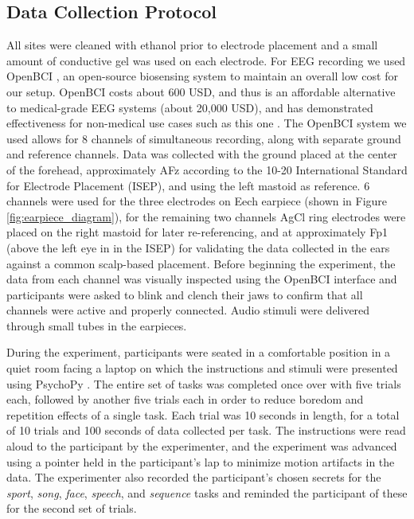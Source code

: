 \documentclass{sigchi}
\begin{document}
\subsection{Data Collection Protocol}
All sites were cleaned with ethanol prior to electrode placement and a small amount of conductive gel was used on each electrode. For EEG recording we used OpenBCI \cite{michalska2009openbci}, an open-source biosensing system to maintain an overall low cost for our setup. OpenBCI costs about 600 USD, and thus is an affordable alternative to medical-grade EEG systems (about 20,000 USD), and has demonstrated effectiveness for non-medical use cases such as this one \cite{Frey2016}. The OpenBCI system we used allows for 8 channels of simultaneous recording, along with separate ground and reference channels. Data was collected with the ground placed at the center of the forehead, approximately AFz according to the 10-20 International Standard for Electrode Placement (ISEP), and using the left mastoid as reference. 6 channels were used for the three electrodes on Eech earpiece (shown in Figure \ref{fig:earpiece_diagram}), for the remaining two channels AgCl ring electrodes were placed on the right mastoid for later re-referencing, and at approximately Fp1 (above the left eye in in the ISEP) for validating the data collected in the ears against a common scalp-based placement. Before beginning the experiment, the data from each channel was visually inspected using the OpenBCI interface and participants were asked to blink and clench their jaws to confirm that all channels were active and properly connected. Audio stimuli were delivered through small tubes in the earpieces.

During the experiment, participants were seated in a comfortable position in a quiet room facing a laptop on which the instructions and stimuli were presented using PsychoPy \cite{peirce2007psychopy}. The entire set of tasks was completed once over with five trials each, followed by another five trials each in order to reduce boredom and repetition effects of a single task. Each trial was 10 seconds in length, for a total of 10 trials and 100 seconds of data collected per task. The instructions were read aloud to the participant by the experimenter, and the experiment was advanced using a pointer held in the participant's lap to minimize motion artifacts in the data. The experimenter also recorded the participant's chosen secrets for the \textit{sport}, \textit{song}, \textit{face}, \textit{speech}, and \textit{sequence} tasks and reminded the participant of these for the second set of trials.
 
\end{document}
